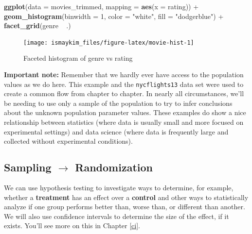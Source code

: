 \documentclass[]{tufte-book}
\newenvironment{Shaded}{\begin{snugshade}}{\end{snugshade}}
\newcommand{\KeywordTok}[1]{\textcolor[rgb]{0.13,0.29,0.53}{\textbf{{#1}}}}
\newcommand{\DataTypeTok}[1]{\textcolor[rgb]{0.13,0.29,0.53}{{#1}}}
\newcommand{\DecValTok}[1]{\textcolor[rgb]{0.00,0.00,0.81}{{#1}}}
\newcommand{\StringTok}[1]{\textcolor[rgb]{0.31,0.60,0.02}{{#1}}}
\newcommand{\NormalTok}[1]{{#1}}
\begin{document}
\begin{Shaded}
\begin{Highlighting}[]
\KeywordTok{ggplot}\NormalTok{(}\DataTypeTok{data =} \NormalTok{movies_trimmed, }\DataTypeTok{mapping =} \KeywordTok{aes}\NormalTok{(}\DataTypeTok{x =} \NormalTok{rating)) +}
\StringTok{  }\KeywordTok{geom_histogram}\NormalTok{(}\DataTypeTok{binwidth =} \DecValTok{1}\NormalTok{, }\DataTypeTok{color =} \StringTok{"white"}\NormalTok{, }\DataTypeTok{fill =} \StringTok{"dodgerblue"}\NormalTok{) +}
\StringTok{  }\KeywordTok{facet_grid}\NormalTok{(genre ~}\StringTok{ }\NormalTok{.)}
\end{Highlighting}
\end{Shaded}

\begin{figure}

{\centering \texttt{[image: ismaykim\_files/figure-latex/movie-hist-1]} 

}

\caption[Faceted histogram of genre vs rating]{Faceted histogram of genre vs rating}\label{fig:movie-hist}
\end{figure}

\textbf{Important note:} Remember that we hardly ever have access to the
population values as we do here. This example and the
\texttt{nycflights13} data set were used to create a common flow from
chapter to chapter. In nearly all circumstances, we'll be needing to use
only a sample of the population to try to infer conclusions about the
unknown population parameter values. These examples do show a nice
relationship between statistics (where data is usually small and more
focused on experimental settings) and data science (where data is
frequently large and collected without experimental conditions).

\subsection{\texorpdfstring{Sampling \(\rightarrow\)
Randomization}{Sampling \textbackslash{}rightarrow Randomization}}\label{sampling-rightarrow-randomization}

We can use hypothesis testing to investigate ways to determine, for
example, whether a \textbf{treatment} has an effect over a
\textbf{control} and other ways to statistically analyze if one group
performs better than, worse than, or different than another. We will
also use confidence intervals to determine the size of the effect, if it
exists. You'll see more on this in Chapter \ref{ci}.
\end{document}

